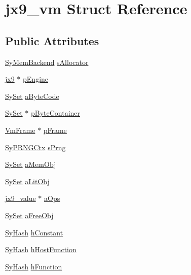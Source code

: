 \hypertarget{structjx9__vm}{\section{jx9\-\_\-vm Struct Reference}
\label{d1/d16/structjx9__vm}
}
\subsection*{Public Attributes}
\begin{DoxyCompactItemize}
\item 
\hyperlink{struct_sy_mem_backend}{Sy\-Mem\-Backend} \hyperlink{structjx9__vm_af0018c7c774a4467f486c8f639cf33a5}{s\-Allocator}
\item 
\hyperlink{structjx9}{jx9} $\ast$ \hyperlink{structjx9__vm_ab1f7b6baaf3160178dfd6e9f7c340f5c}{p\-Engine}
\item 
\hyperlink{struct_sy_set}{Sy\-Set} \hyperlink{structjx9__vm_a60d7e1d615b5dfdccd213b21b13fd4dc}{a\-Byte\-Code}
\item 
\hyperlink{struct_sy_set}{Sy\-Set} $\ast$ \hyperlink{structjx9__vm_acd49ac6c785aafdacdaef5982fb486d0}{p\-Byte\-Container}
\item 
\hyperlink{struct_vm_frame}{Vm\-Frame} $\ast$ \hyperlink{structjx9__vm_a3c5beb1fe1517e2cd1c6c41ffb972bf8}{p\-Frame}
\item 
\hyperlink{struct_sy_p_r_n_g_ctx}{Sy\-P\-R\-N\-G\-Ctx} \hyperlink{structjx9__vm_a95174c79b9b1017dc4a59512b90180d8}{s\-Prng}
\item 
\hyperlink{struct_sy_set}{Sy\-Set} \hyperlink{structjx9__vm_af587fc6fb3877cd9fffd361b8b12a2ea}{a\-Mem\-Obj}
\item 
\hyperlink{struct_sy_set}{Sy\-Set} \hyperlink{structjx9__vm_a856dfe79ab60ac5baaf9ce30e90011bd}{a\-Lit\-Obj}
\item 
\hyperlink{structjx9__value}{jx9\-\_\-value} $\ast$ \hyperlink{structjx9__vm_a48122577304fdc73e5d093277ddc1534}{a\-Ops}
\item 
\hyperlink{struct_sy_set}{Sy\-Set} \hyperlink{structjx9__vm_a0515626acaf63e6a3b6db9a0f0212b28}{a\-Free\-Obj}
\item 
\hyperlink{struct_sy_hash}{Sy\-Hash} \hyperlink{structjx9__vm_a0848e3939d64bc07b41f4511d72f0cfe}{h\-Constant}
\item 
\hyperlink{struct_sy_hash}{Sy\-Hash} \hyperlink{structjx9__vm_a2fc55ef43df0c3b8730134f8f0cea282}{h\-Host\-Function}
\item 
\hyperlink{struct_sy_hash}{Sy\-Hash} \hyperlink{structjx9__vm_aa5f577fb9db6a5391af857a15e46f41a}{h\-Function}

\end{DoxyCompactItemize}
